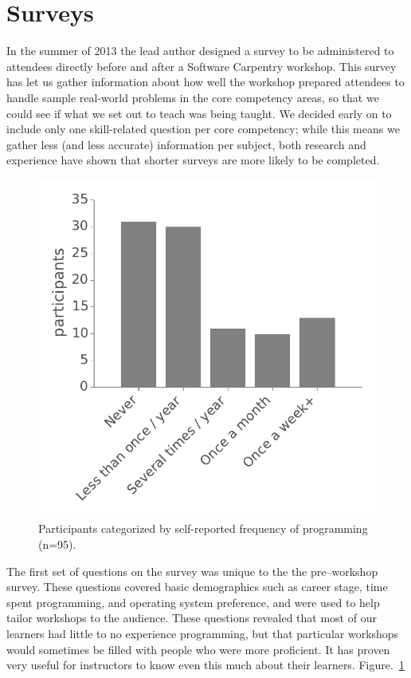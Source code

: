 \documentclass[10pt, twocolumn]{article}
\begin{document}
	\section{Surveys}
	In the summer of 2013
	the lead author designed a survey
	to be administered to attendees directly before and after a Software Carpentry workshop.
	This survey has let us gather information about
	how well the workshop prepared attendees to handle sample real-world problems in the core competency areas,
	so that we could see if what we set out to teach was being taught.
	We decided early on to include only one skill-related question per core competency;
	while this means we gather less (and less accurate) information per subject,
	both research and experience have shown that shorter surveys are more likely to be completed.
	
	\begin{figure}[!b]
		\includegraphics[width=\linewidth]{figures/ProgrammingFrequency}
		\caption{
		    Participants categorized by self-reported frequency of programming (n=95).
	    }
		\label{frequency}
	\end{figure}
	The first set of questions on the survey was unique to the the pre--workshop survey.
	These questions covered basic demographics such as career stage,
	time spent programming,
	and operating system preference,
	and were used to help tailor workshops to the audience.
	These questions revealed that most of our learners had little to no experience programming,
	but that particular workshops would sometimes be filled with people who were more proficient.
	It has proven very useful for instructors to know even this much about their learners. Figure.~\ref{frequency}
	
\end{document}
